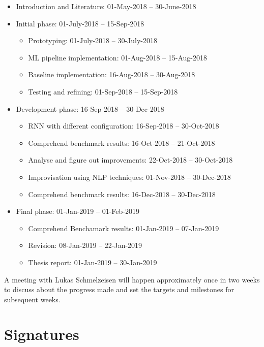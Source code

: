 \documentclass[a4paper, 11pt]{article}
\begin{document}
\begin{itemize}
	\item Introduction and Literature: 01-May-2018 – 30-June-2018
	\item Initial phase: 01-July-2018 – 15-Sep-2018
	\begin{itemize}
		\item Prototyping: 01-July-2018 – 30-July-2018
		\item ML pipeline implementation: 01-Aug-2018 – 15-Aug-2018
        \item Baseline implementation: 16-Aug-2018 – 30-Aug-2018
        \item Testing and refining: 01-Sep-2018 – 15-Sep-2018
	\end{itemize}
	\item Development phase: 16-Sep-2018 – 30-Dec-2018
	\begin{itemize}
		\item RNN with different configuration: 16-Sep-2018 – 30-Oct-2018
		\item Comprehend benchmark results: 16-Oct-2018 – 21-Oct-2018
		\item Analyse and figure out improvements: 22-Oct-2018 – 30-Oct-2018
        \item Improvisation using NLP techniques: 01-Nov-2018 – 30-Dec-2018
        \item Comprehend benchmark results: 16-Dec-2018 – 30-Dec-2018
	\end{itemize}
	\item Final phase: 01-Jan-2019 – 01-Feb-2019
	\begin{itemize}
	 	\item Comprehend Benchamark results: 01-Jan-2019 – 07-Jan-2019
		\item Revision: 08-Jan-2019 – 22-Jan-2019
		\item Thesis report: 01-Jan-2019 – 30-Jan-2019
	\end{itemize}
\end{itemize}

A meeting with Lukas Schmelzeisen will happen approximately once in two weeks to discuss about the progress made and set the targets and milestones for subsequent weeks. 


\newpage

\newpage
\section{Signatures}
\end{document}
